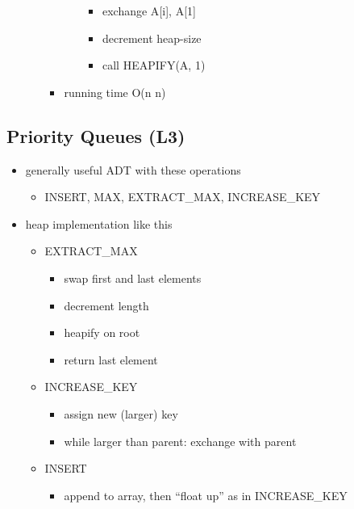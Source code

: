 \documentclass[
]{article}
\providecommand{\tightlist}{%
  \setlength{\itemsep}{0pt}\setlength{\parskip}{0pt}}
\begin{document}
\begin{itemize}
\begin{itemize}
\begin{itemize}
\begin{itemize}
        \begin{itemize}
        \tightlist
        \item
          exchange A{[}i{]}, A{[}1{]}
        \item
          decrement heap-size
        \item
          call HEAPIFY(A, 1)
        \end{itemize}
      \end{itemize}
    \item
      running time O(n \log n)
    \end{itemize}
  \end{itemize}
\end{itemize}

\hypertarget{priority-queues-l3}{%
\subsection{Priority Queues (L3)}\label{priority-queues-l3}}

\begin{itemize}
\tightlist
\item
  generally useful ADT with these operations

  \begin{itemize}
  \tightlist
  \item
    INSERT, MAX, EXTRACT\_MAX, INCREASE\_KEY
  \end{itemize}
\item
  heap implementation like this

  \begin{itemize}
  \tightlist
  \item
    EXTRACT\_MAX

    \begin{itemize}
    \tightlist
    \item
      swap first and last elements
    \item
      decrement length
    \item
      heapify on root
    \item
      return last element
    \end{itemize}
  \item
    INCREASE\_KEY

    \begin{itemize}
    \tightlist
    \item
      assign new (larger) key
    \item
      while larger than parent: exchange with parent
    \end{itemize}
  \item
    INSERT

    \begin{itemize}
    \tightlist
    \item
      append to array, then ``float up'' as in INCREASE\_KEY
    \end{itemize}
  \end{itemize}
\end{itemize}
\end{document}

